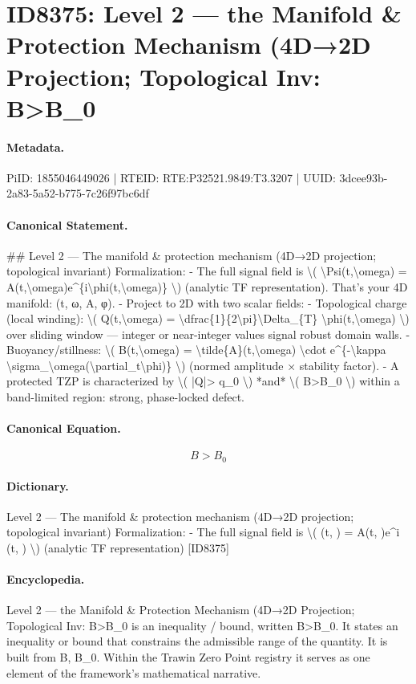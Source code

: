 \section*{ID8375: Level 2 — the Manifold \& Protection Mechanism (4D→2D Projection; Topological Inv: B>B\_0}
\paragraph{Metadata.}
PiID: 1855046449026 | RTEID: RTE:P32521.9849:T3.3207 | UUID: 3dcee93b-2a83-5a52-b775-7c26f97bc6df

\paragraph{Canonical Statement.}
\#\# Level 2 — The manifold \& protection mechanism (4D→2D projection; topological invariant) Formalization: - The full signal field is \textbackslash{}( \textbackslash{}Psi(t,\textbackslash{}omega) = A(t,\textbackslash{}omega)e\textasciicircum{}\{i\textbackslash{}phi(t,\textbackslash{}omega)\} \textbackslash{}) (analytic TF representation). That’s your 4D manifold: (t, ω, A, φ). - Project to 2D with two scalar fields: - Topological charge (local winding): \textbackslash{}( Q(t,\textbackslash{}omega) = \textbackslash{}dfrac\{1\}\{2\textbackslash{}pi\}\textbackslash{}Delta\_\{T\} \textbackslash{}phi(t,\textbackslash{}omega) \textbackslash{}) over sliding window — integer or near-integer values signal robust domain walls. - Buoyancy/stillness: \textbackslash{}( B(t,\textbackslash{}omega) = \textbackslash{}tilde\{A\}(t,\textbackslash{}omega) \textbackslash{}cdot e\textasciicircum{}\{-\textbackslash{}kappa \textbackslash{}sigma\_\textbackslash{}omega(\textbackslash{}partial\_t\textbackslash{}phi)\} \textbackslash{}) (normed amplitude × stability factor). - A protected TZP is characterized by \textbackslash{}( |Q|> q\_0 \textbackslash{}) *and* \textbackslash{}( B>B\_0 \textbackslash{}) within a band-limited region: strong, phase-locked defect.

\paragraph{Canonical Equation.}
\[
B>B_0
\]

\paragraph{Dictionary.}
Level 2 — The manifold \& protection mechanism (4D→2D projection; topological invariant) Formalization: - The full signal field is \textbackslash{}( (t, ) = A(t, )e\textasciicircum{}i (t, ) \textbackslash{}) (analytic TF representation) [ID8375]

\paragraph{Encyclopedia.}
Level 2 — the Manifold \& Protection Mechanism (4D→2D Projection; Topological Inv: B>B\_0 is an inequality / bound, written B>B\_0. It states an inequality or bound that constrains the admissible range of the quantity. It is built from B, B\_0. Within the Trawin Zero Point registry it serves as one element of the framework's mathematical narrative.
